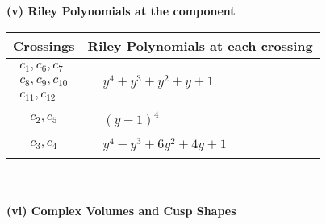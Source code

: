 \documentclass[1p]{elsarticle_modified}
\theoremstyle{definition}
\begin{document}
\newpage\renewcommand{\arraystretch}{1}
\flushleft \textbf{(v) Riley Polynomials at the component}\newline \\
\begin{tabular}{m{50pt}|m{274pt}}
Crossings & \hspace{64pt}Riley Polynomials at each crossing \\
\hline $$\begin{aligned}c_{1},c_{6},c_{7}\\c_{8},c_{9},c_{10}\\c_{11},c_{12}\end{aligned}$$&$\begin{aligned}
&y^4+y^3+y^2+y+1
\end{aligned}$\\
\hline $$\begin{aligned}c_{2},c_{5}\end{aligned}$$&$\begin{aligned}
&(y-1)^4
\end{aligned}$\\
\hline $$\begin{aligned}c_{3},c_{4}\end{aligned}$$&$\begin{aligned}
&y^4- y^3+6 y^2+4 y+1
\end{aligned}$\\
\hline
\end{tabular}\\~\\
\newpage\flushleft \textbf{(vi) Complex Volumes and Cusp Shapes}
\end{document}
